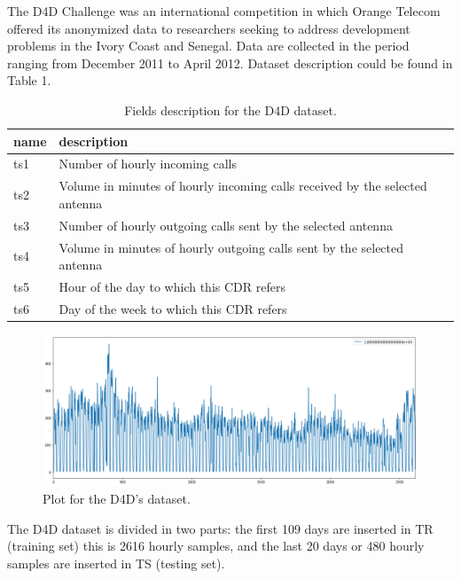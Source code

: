 \documentclass[12pt,a4paper]{article}
\theoremstyle{myplain}
\numberwithin{equation}{section}
\begin{document}
The D4D Challenge was an international competition in which Orange Telecom offered its anonymized data to researchers seeking to address development problems in the Ivory Coast and Senegal. Data are collected in the period ranging from
December 2011 to April 2012. Dataset description could be found in Table 1.
\begin{table}[h!]
\label{tab:table1}
\begin{tabular}{l|l}
name & description \\
\hline
ts1 & Number of hourly incoming calls \\
ts2 & Volume in minutes of hourly incoming calls received by the selected antenna \\
ts3 & Number of hourly outgoing calls sent by the selected antenna \\
ts4 & Volume in minutes of hourly outgoing calls sent by the selected antenna \\
ts5 & Hour of the day to which this CDR refers \\
ts6 & Day of the week to which this CDR refers \\
\hline
\end{tabular}
\caption{Fields description for the D4D dataset.}
\end{table}

\begin{figure}
\includegraphics[scale=0.36]{D4D_data_plot}
\caption{Plot for the D4D's dataset.}
\end{figure}

The D4D dataset is divided in two parts: the first 109 days are inserted in TR (training set) this is 2616 hourly samples, and the last 20 days or 480 hourly samples are inserted in TS (testing set).
\end{document}
